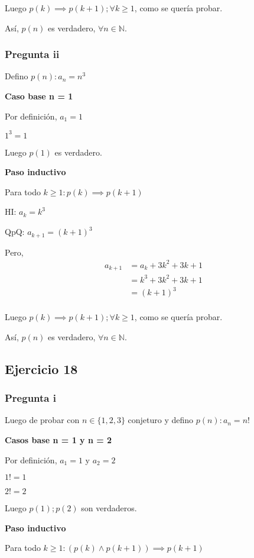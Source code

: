Luego $p(k) \implies p(k+1); \forall k \geq 1$, como se quería probar.

Así, $p(n)$ es verdadero, $\forall n \in \mathbb{N}$.

\subsubsection{Pregunta ii}

Defino $ p(n): a_n = n^3 $

\textbf{Caso base n = 1}

Por definición, $a_1 = 1$

$ 1^3 = 1 $

Luego $ p(1) $ es verdadero.

\textbf{Paso inductivo}

Para todo $k \geq 1: p(k) \implies p(k+1)$

HI: $ a_k = k^3 $

QpQ: $ a_{k+1} = (k+1)^3$

Pero,
\begin{align*}
    a_{k+1} &= a_k + 3k^2 + 3k + 1 \\
    &= k^3 + 3k^2 + 3k + 1 \\
    &= (k+1)^3 \\
\end{align*}

Luego $p(k) \implies p(k+1); \forall k \geq 1$, como se quería probar.

Así, $p(n)$ es verdadero, $\forall n \in \mathbb{N}$.

\subsection{Ejercicio 18}

\subsubsection{Pregunta i}

Luego de probar con $ n \in \{ 1,2,3 \} $ conjeturo y defino $ p(n): a_n = n! $

\textbf{Casos base n = 1 y n = 2}

Por definición, $a_1 = 1$ y $a_2 = 2$

$ 1! = 1$

$ 2! = 2 $

Luego $ p(1); p(2) $ son verdaderos.

\textbf{Paso inductivo}

Para todo $k \geq 1: (p(k) \wedge p(k+1)) \implies p(k+1)$

